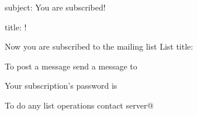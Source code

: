 subject: You are subscribed!

title: !

Now you are subscribed to the mailing list %
List title: %

To post a message send a message to %

Your subscription's password is

To do any list operations contact server@%

